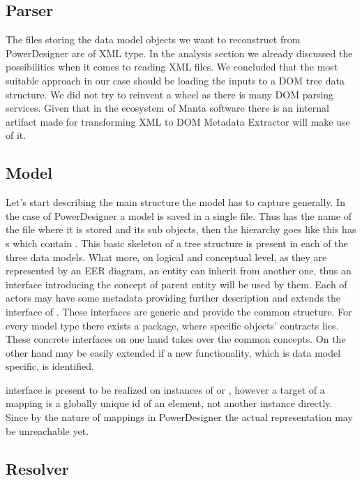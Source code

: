 \subsection{Parser}

The files storing the data model objects we want to reconstruct from PowerDesigner are of XML type.
In the analysis section we already discussed the possibilities when it comes to reading XML files. We concluded that the most suitable approach in our case should be loading the inputs to a DOM tree data structure.
We did not try to reinvent a wheel as there is many DOM parsing services. 
Given that in the ecosystem of Manta software there is an internal artifact made for transforming XML to DOM Metadata Extractor will make use of it.

\subsection{Model}

Let's start describing the main structure the model has to capture generally.
In the case of PowerDesigner a model is saved in a single file. 
Thus  has the name of the file where it is stored and its sub objects, then the hierarchy goes like this  has s which contain .
This basic skeleton of a tree structure is present in each of the three data models. What more, on logical and conceptual level, as they are represented by an EER diagram, an entity can inherit from another one, thus an interface  introducing the concept of parent entity will be used by them. Each of actors may have some metadata providing further description and extends the interface of .
These interfaces are generic and provide the common structure.
For every model type there exists a package, where specific objects' contracts lies. These concrete interfaces on one hand takes over the common concepts. On the other hand may be easily extended if a new functionality, which is data model specific, is identified.

 interface is present to be realized on instances of  or  , however a target of a mapping is a globally unique id of an element, not another instance directly. Since by the nature of mappings in PowerDesigner the actual representation may be unreachable yet.

\subsection{Resolver}

